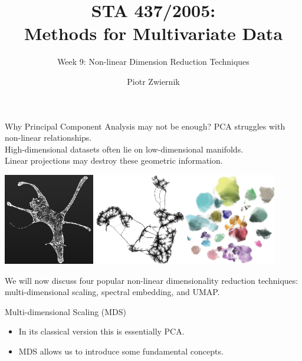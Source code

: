 \documentclass[11pt,handout,aspectratio=169]{beamer}
\title[STA437-Week1]{STA 437/2005: \\ Methods for Multivariate Data}
\subtitle[]{Week 9: Non-linear Dimension Reduction Techniques}
\author[Piotr Zwiernik]{Piotr Zwiernik}
\institute[UofT]{University of Toronto}
\date{}
\begin{document}
\maketitle


\begin{frame}{Why Principal Component Analysis may not be enough?}
  PCA struggles with non-linear relationships. \\[2mm]
  High-dimensional datasets often lie on low-dimensional manifolds. \\[2mm]
  Linear projections may destroy these geometric information.
  \begin{center}
 \includegraphics[height=4cm]{pics/exUMAP1}  \includegraphics[height=4cm]{pics/exUMAP2}\includegraphics[height=4cm]{pics/exUMAP3}	
  \end{center}
  We will now discuss four popular non-linear dimensionality reduction techniques: multi-dimensional scaling, spectral embedding, and UMAP.
 \end{frame}

\begin{frame}{}
	\begin{center}
		\alert{\Huge Multi-dimensional Scaling (MDS)}
	\end{center}
	\begin{itemize}
		\item In its classical version this is essentially PCA.
		\item MDS allows us to introduce some fundamental concepts.
	\end{itemize}
\end{frame}
\end{document}
